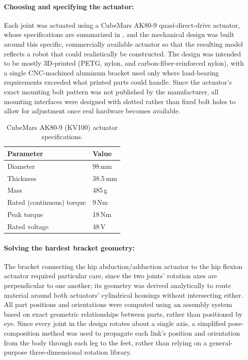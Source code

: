 \documentclass[12pt]{article}
\begin{document}
\paragraph{Choosing and specifying the actuator:} Each joint was actuated using a CubeMars AK80-9 quasi-direct-drive actuator, whose specifications are summarized in , and the mechanical design was built around this specific, commercially available actuator so that the resulting model reflects a robot that could realistically be constructed. The design was intended to be mostly 3D-printed (PETG, nylon, and carbon-fiber-reinforced nylon), with a single CNC-machined aluminum bracket used only where load-bearing requirements exceeded what printed parts could handle. Since the actuator's exact mounting bolt pattern was not published by the manufacturer, all mounting interfaces were designed with slotted rather than fixed bolt holes to allow for adjustment once real hardware becomes available.

\begin{table}[htbp]
    \centering
    \caption{CubeMars AK80-9 (KV100) actuator specifications.}
    \label{tab:ak80_9_specs}
    \begin{tabular}{ll}
        \hline
        Parameter & Value \\
        \hline
        Diameter & 98\,mm \\
        Thickness & 38.5\,mm \\
        Mass & 485\,g \\
        Rated (continuous) torque & 9\,Nm \\
        Peak torque & 18\,Nm \\
        Rated voltage & 48\,V \\
        \hline
    \end{tabular}
\end{table}

\paragraph{Solving the hardest bracket geometry:} The bracket connecting the hip abduction/adduction actuator to the hip flexion actuator required particular care, since the two joints' rotation axes are perpendicular to one another; its geometry was derived analytically to route material around both actuators' cylindrical housings without intersecting either. All part positions and orientations were computed using an assembly system based on exact geometric relationships between parts, rather than positioned by eye. Since every joint in the design rotates about a single axis, a simplified pose-composition method was used to propagate each link's position and orientation from the body through each leg to the feet, rather than relying on a general-purpose three-dimensional rotation library.
\end{document}
